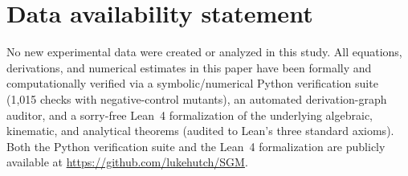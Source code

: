 \documentclass[aps,prd,onecolumn,tightenlines,nofootinbib,notitlepage,10pt,floatfix]{revtex4-2}
\theoremstyle{indentedtheorem}
\begin{document}
\section*{Data availability statement}
No new experimental data were created or analyzed in this study. All equations, derivations, and numerical estimates in this paper have been formally and computationally verified via a symbolic/numerical Python verification suite (1,015 checks with negative-control mutants), an automated derivation-graph auditor, and a sorry-free Lean~4 formalization of the underlying algebraic, kinematic, and analytical theorems (audited to Lean's three standard axioms). Both the Python verification suite and the Lean~4 formalization are publicly available at \url{https://github.com/lukehutch/SGM}.



\end{document}
